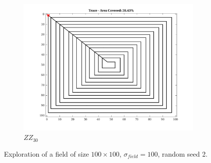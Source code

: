 \begin{figure}[htb!]
\begin{subfigure}[t]{0.25\textwidth}
    \end{subfigure}%
    \begin{subfigure}[t]{0.25\textwidth}
        \centering
        \includegraphics[width=\linewidth]{figures/path_zz_30p_100x100_sf_100_seed_2.png}
        \captionsetup{skip=0.20\baselineskip,size=footnotesize}
        \caption{$ZZ_{30}$}
    \end{subfigure}%
    \captionsetup{skip=0.20\baselineskip}
    \caption{Exploration of a field of size $100 \times 100$, $\sigma_{field} = 100$, random seed 2.}
    \label{fig:sf100}
\end{figure}


